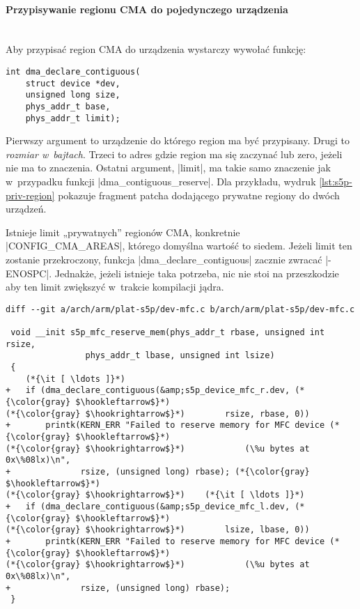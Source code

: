 \paragraph{Przypisywanie regionu CMA do pojedynczego urządzenia} \hspace{0pt} \\

Aby przypisać region CMA do urządzenia wystarczy wywołać funkcję:

\begin{lstlisting}
int dma_declare_contiguous(
	struct device *dev,
	unsigned long size,
	phys_addr_t base,
	phys_addr_t limit);
\end{lstlisting}

Pierwszy argument to urządzenie do którego region ma być przypisany.
Drugi to \emph{rozmiar w~bajtach}.  Trzeci to adres gdzie region ma
się zaczynać lub zero, jeżeli nie ma to znaczenia.  Ostatni argument,
\code|limit|, ma takie samo znaczenie jak w~przypadku funkcji
\code|dma_contiguous_reserve|.  Dla przykładu, wydruk
\ref{lst:s5p-priv-region} pokazuje fragment patcha dodającego prywatne
regiony do dwóch urządzeń.

Istnieje limit „prywatnych” regionów CMA, konkretnie
\code|CONFIG_CMA_AREAS|, którego domyślna wartość to siedem.
Jeżeli limit ten zostanie przekroczony, funkcja
\code|dma_declare_contiguous| zacznie zwracać
\code|-ENOSPC|.  Jednakże, jeżeli istnieje taka potrzeba, nic nie
stoi na przeszkodzie aby ten limit zwiększyć w~trakcie kompilacji
jądra.

\begin{lstlisting}[float=tbhp,caption={Przypisanie prywatnych regionów
      CMA do dwóch urządzeń.},label=lst:s5p-priv-region]
diff --git a/arch/arm/plat-s5p/dev-mfc.c b/arch/arm/plat-s5p/dev-mfc.c

 void __init s5p_mfc_reserve_mem(phys_addr_t rbase, unsigned int rsize,
 				phys_addr_t lbase, unsigned int lsize)
 {
	(*{\it [ \ldots ]}*)
+	if (dma_declare_contiguous(&amp;s5p_device_mfc_r.dev, (*{\color{gray} $\hookleftarrow$}*)
(*{\color{gray} $\hookrightarrow$}*)		rsize, rbase, 0))
+		printk(KERN_ERR "Failed to reserve memory for MFC device (*{\color{gray} $\hookleftarrow$}*)
(*{\color{gray} $\hookrightarrow$}*)			(\%u bytes at 0x\%08lx)\n",
+		       rsize, (unsigned long) rbase); (*{\color{gray} $\hookleftarrow$}*)
(*{\color{gray} $\hookrightarrow$}*)	(*{\it [ \ldots ]}*)
+	if (dma_declare_contiguous(&amp;s5p_device_mfc_l.dev, (*{\color{gray} $\hookleftarrow$}*)
(*{\color{gray} $\hookrightarrow$}*)		lsize, lbase, 0))
+		printk(KERN_ERR "Failed to reserve memory for MFC device (*{\color{gray} $\hookleftarrow$}*)
(*{\color{gray} $\hookrightarrow$}*)			(\%u bytes at 0x\%08lx)\n",
+		       rsize, (unsigned long) rbase);
 }
\end{lstlisting}

